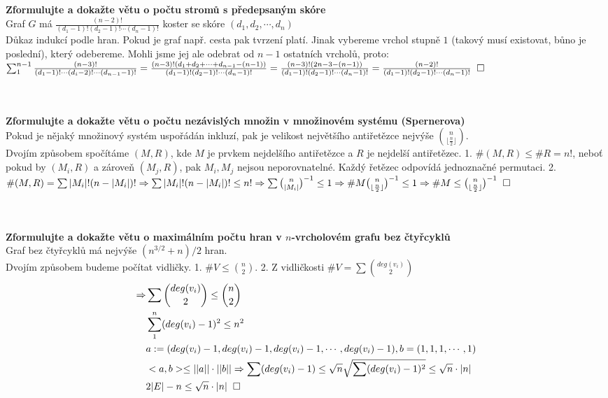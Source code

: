\documentclass[a4paper]{article}
\newcommand{\qed}{\hspace{0.2cm}\square}
\newcommand{\hlava}[1]{\text{} \\ \text{} \\ \text{} \hspace{-0.27cm} \textbf{#1} \\}
\begin{document}
\hlava{Zformulujte a dokažte větu o počtu stromů s předepsaným skóre}
Graf $G$ má $\frac{(n-2)!}{(d_1-1)!(d_2-1)!\cdots (d_n-1)!}$ koster se skóre $(d_1, d_2, \cdots, d_n)$ \\
Důkaz indukcí podle hran. Pokud je graf např. cesta pak tvrzení platí. Jinak vybereme vrchol stupně $1$ (takový musí existovat, bůno je poslední), který odebereme. Mohli jsme jej ale odebrat od $n-1$ ostatních vrcholů, proto: $\sum_1^{n-1} \frac{(n-3)!}{(d_1-1)!\cdots(d_i-2)!\cdots(d_{n-1}-1)!} = \frac{(n-3)!(d_1+d_2+\cdots +d_{n-1} - (n-1) )}{(d_1-1)!(d_2-1)!\cdots (d_n-1)!} = \frac{(n-3)!(2n-3 - (n-1) )}{(d_1-1)!(d_2-1)!\cdots (d_n-1)!} = \frac{(n-2)!}{(d_1-1)!(d_2-1)!\cdots (d_n-1)!} \qed$

\hlava{Zformulujte a dokažte větu o počtu nezávislých množin v množinovém systému (Spernerova)}
Pokud je nějaký množinový systém uspořádán inkluzí, pak je velikost největšího antiřetězce nejvýše ${n \choose \lfloor \frac{n}{2} \rfloor}$. \\
Dvojím způsobem spočítáme $(M, R)$, kde $M$ je prvkem nejdelšího antiřetězce a $R$ je nejdelší antiřetězec. 1. $\#(M, R) \le \#R = n!$, neboť pokud by $(M_i, R)$ a zároveň $(M_j, R)$, pak $M_i, M_j$ nejsou neporovnatelné. Každý řetězec odpovídá jednoznačné permutaci. 2. $\#(M,R) = \sum |M_i|!(n-|M_i|)! \Rightarrow \sum |M_i|!(n-|M_i|)! \le n! \Rightarrow \sum {n \choose |M_i|}^{-1} \le 1 \Rightarrow \#M{n \choose \lfloor \frac{n}{2} \rfloor}^{-1} \le 1 \Rightarrow \#M \le {n \choose \lfloor \frac{n}{2} \rfloor}^{-1} \qed $

\hlava{Zformulujte a dokažte větu o maximálním počtu hran v $n$-vrcholovém grafu bez čtyřcyklů}
Graf bez čtyřcyklů má nejvýše $(n^{3/2}+n)/2$ hran. \\
Dvojím způsobem budeme počítat vidličky. 1. $ \#V \le {n \choose 2}$. 2. Z vidličkosti $\#V = \sum {deg(v_i)  \choose 2}$\\
\begin{align*}
\Rightarrow & \sum {deg(v_i)  \choose 2} \le {n \choose 2} \\
	& \sum_1^n (deg(v_i)-1)^2 \le n^2 \\
	& a := (deg(v_i)-1, deg(v_i)-1,deg(v_i)-1, \cdots, deg(v_i)-1), b = (1,1,1,\cdots,1) \\
	& <a,b> \le ||a||\cdot||b|| \Rightarrow \sum (deg(v_i)-1) \le \sqrt{n} \sqrt{\sum (deg(v_i)-1)^2} \le \sqrt{n} \cdot |n| \\
	& 2|E|-n \le \sqrt{n} \cdot |n| \qed
\end{align*}
\end{document}
